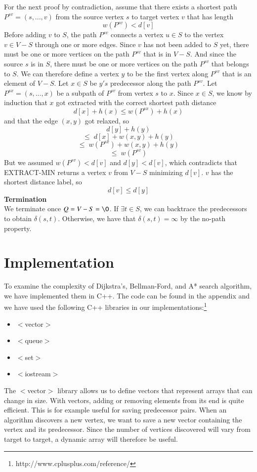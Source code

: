 \documentclass[11pt]{article}
\begin{document}
\noindent For the next proof by contradiction, assume that there exists a shortest path $P^{sv}=(s, ..., v)$ from the source vertex $s$ to target vertex $v$ that has length $$w(P^{sv}) < d[v]$$
Before adding $v$ to $S$, the path $P^{sv}$ connects a vertex $u\in S$ to the vertex $v\in V-S$ through one or more edges. Since $v$ has not been added to $S$ yet, there must be one or more vertices on the path $P^{sv}$ that is in $V-S$. And since the source $s$ is in $S$, there must be one or more vertices on the path $P^{sv}$ that belongs to $S$. We can therefore define a vertex $y$ to be the first vertex along $P^{sv}$ that is an element of $V-S$. Let $x\in S$ be $y's$ predecessor along the path $P^{sv}$. Let $P^{sx}=(s, ..., x)$ be a subpath of $P^{sv}$ from vertex $s$ to $x$. Since $x \in S$, we know by induction that $x$ got extracted with the correct shortest path distance $$d[x] + h(x) \leq w(P^{sx}) + h(x)$$and that the edge $(x,y)$ got relaxed, so $$d[y]+h(y)$$ 
$$\leq \; d[x]+w(x,y)+h(y)$$
$$\leq \; w(P^{sx}) + w(x,y) + h(y)$$
$$\leq \; w(P^{sv})$$But we assumed $w(P^{sv}) < d[v]$ and $d[y] < d[v]$, which contradicts that EXTRACT-MIN returns a vertex $v$ from $V-S$ minimizing $d[v]$. $v$ has the shortest distance label, so $$d[v] \leq d[y]$$
\textbf{Termination}\\
We terminate once $Q = V-S =\O$. If $\exists t \in S$, we can backtrace the predecessors to obtain $\delta(s,t)$. Otherwise, we have that $\delta(s,t) = \infty$ by the no-path property.\\


\section{Implementation}
To examine the complexity of Dijkstra's, Bellman-Ford, and A* search algorithm, we have implemented them in C++. The code can be found in the appendix and we have used the following C++ libraries in our implementations:\footnote{http://www.cplusplus.com/reference/}

\begin{itemize}
\item $<$vector$>$
\item $<$queue$>$
\item $<$set$>$
\item $<$iostream$>$
\end{itemize}

\noindent The $<$vector$>$ library allows us to define vectors that represent arrays that can change in size. With vectors, adding or removing elements from its end is quite efficient. This is for example useful for saving predecessor pairs. When an algorithm discovers a new vertex, we want to save a new vector containing the vertex and its predecessor. Since the number of vertices discovered will vary from target to target, a dynamic array will therefore be useful.\\
\end{document}
